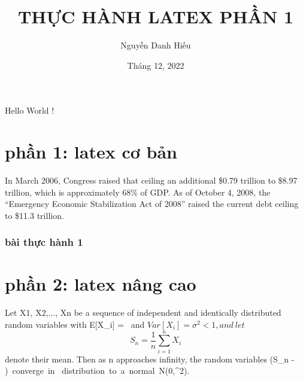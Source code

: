 \documentclass [12pt, A4paper] {article}
\title {THỰC HÀNH LATEX PHẦN 1}
\author{Nguyễn Danh Hiếu}
\date{Tháng 12, 2022}
\begin{document}
\maketitle
Hello World !
\section{phần 1: latex cơ bản}
In March 2006, Congress raised that ceiling an additional \$0.79
trillion to \$8.97 trillion, which is approximately 68\% of GDP. As of
October 4, 2008, the “Emergency Economic Stabilization Act of
2008” raised the current debt ceiling to \$11.3 trillion.
\subsubsection{bài thực hành 1}
\section {phần 2: latex nâng cao }
Let X1, X2,..., Xn be a sequence of independent and identically
distributed random variables with E[X_i] = \mu \ and $
Var[X_i] = \sigma ^2 < 1, and \ let $
\begin{equation} 
                          S_n = \frac{1}{n} \sum_{i=1}^{n} X_i
\end{equation}
denote their mean. Then as n approaches infinity, the random
variables (S_n - \mu)\ converge\ in \ distribution\ to\ a\ normal\ N(0,\sigma^2).
\end{document}
